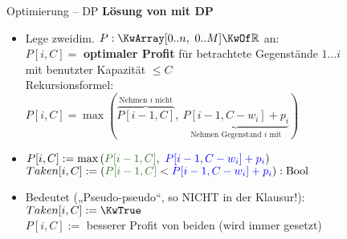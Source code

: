 \begin{frame}[t]{Optimierung – DP}
	\vspace{-.5\baselineskip}
	\textbf{Lösung von \Knapsack mit DP}  
	\begin{itemize}
		\item Lege zweidim. $P: \KwArray[0..n, \ 0..M] \KwOf \R$ an: \\ 
		\impl $P[i, C] = $ \textbf{optimaler Profit} für betrachtete Gegenstände $1...i$ \\ mit benutzter Kapazität $\leq C$ \\
		\impl Rekursionsformel: \\ \vspace{-.7\baselineskip}
		\qqquad \quad $P[i, C] = \max\left(\overbrace{P[i-1, C]}^\text{Nehmen $i$ nicht}, \ \underbrace{P[i-1, C - w_i] + p_i}_\text{Nehmen Gegenstand $i$ mit}\right)$
		\pause 
		\item 
		 \vspace{-\baselineskip}
		\quad $P[i, C] := \max\left(\textcolor{darkgreen}{P[i-1, C]}, \ \textcolor{blue}{P[i-1, C - w_i] + p_i}\right)$ \\
		\quad $Taken[i, C] := \tuple{\textcolor{darkgreen}{P[i-1, C]} < \textcolor{blue}{P[i-1, C - w_i] + p_i}} : \|Bool|$
		\pause
		\item Bedeutet \: {\small („Pseudo-pseudo“, so NICHT in der Klausur!)}: \\
		\vspace{-\baselineskip}
		\quad {} 
		\qquad 		$Taken[i, C] := \KwTrue$ \\
		\quad		$P[i, C] := $ besserer Profit von beiden \quad (wird immer gesetzt)
		  
		
	\end{itemize}
\end{frame}

